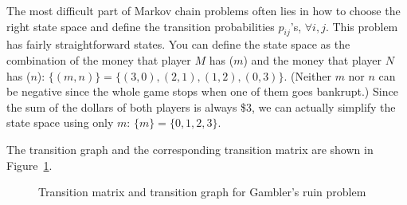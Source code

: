 \begin{solution}
The most difficult part of Markov chain problems often lies in how to choose the right
state space and define the transition probabilities $p_{ij}$'s, $\forall i,j$. This problem
has fairly straightforward states. You can define the state space as the combination of
the money that player $M$ has ($m$) and the money that player $N$ has ($n$):
$\{(m,n)\}=\{(3,0),(2,1),(1,2),(0,3)\}$. (Neither $m$ nor $n$ can be negative since
the whole game stops when one of them goes bankrupt.) Since the sum of the dollars of both
players is always \$3, we can actually simplify the state space using only $m$:
$\{m\}=\{0,1,2,3\}$.

The transition graph and the corresponding transition matrix are shown in
Figure~\ref{fig:zhou-figure-5-2}.

\begin{figure}[ht]
\centering
{}
\qquad
{}
\caption{Transition matrix and transition graph for Gambler's ruin problem}
\label{fig:zhou-figure-5-2}
\end{figure}


\end{solution}
